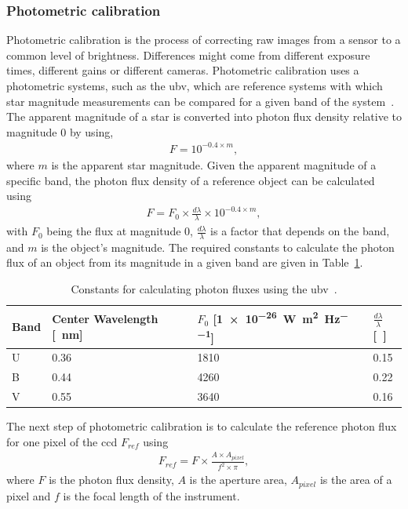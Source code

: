 \subsubsection{Photometric calibration} \label{sec:photo_cal}
Photometric calibration is the process of correcting raw images from a sensor to a common level of brightness. Differences might come from different exposure times, different gains or different cameras. Photometric calibration uses a photometric systems, such as the \gls{ubv}, which are reference systems with which star magnitude measurements can be compared for a given band of the system~\cite{Bessell1979UBVRIPhotometry}.
The apparent magnitude of a star is converted into photon flux density relative to magnitude 0 by using,
\begin{align}
    F = 10^{-0.4 \times m}, \label{eq:mag_flux}
\end{align}
where $m$ is the apparent star magnitude. 
Given the apparent magnitude of a specific band, the photon flux density of a reference object can be calculated using
\begin{align}
    F = F_0 \times \frac{d\lambda}{\lambda} \times 10^{-0.4 \times m}, \label{eq:comp_flux_0mag}
\end{align}
with $F_0$ being the flux at magnitude 0, $\frac{d\lambda}{\lambda}$ is a factor that depends on the band, and $m$ is the object's magnitude. The required constants to calculate the photon flux of an object from its magnitude in a given band are given in Table~\ref{tab:ubv_constants}.

\begin{table}[htb]
    \centering
    \caption{Constants for calculating photon fluxes using the \gls{ubv}~\cite{Bessell1979UBVRIPhotometry}.}
    \label{tab:ubv_constants}
    \begin{tabular}{l|l|l|l}
        \textbf{Band} & \textbf{Center Wavelength [\SI{}{\nano\meter}]} & \textbf{$F_0$ [\SI{1e-26}{\watt\per\square\meter\per\hertz}]} & \textbf{$\frac{d\lambda}{\lambda}$}[~] \\ \hline
        U             & 0.36                       & 1810        & 0.15             \\
        B             & 0.44                       & 4260        & 0.22             \\
        V             & 0.55                       & 3640        & 0.16            
    \end{tabular}
\end{table}

The next step of photometric calibration is to calculate the reference photon flux for one pixel of the \gls{ccd} $F_{ref}$ using
\begin{align}
    F_{ref} = F \times \frac{A \times A_{pixel}}{f^2 \times \pi}, \label{eq:comp_flux_pix}
\end{align}
where $F$ is the photon flux density, $A$ is the aperture area, $A_{pixel}$ is the area of a pixel and $f$ is the focal length of the instrument.

